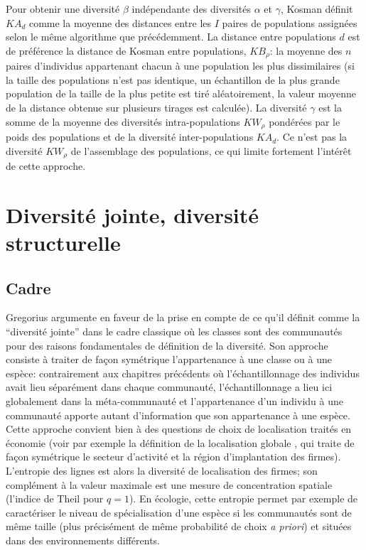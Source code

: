 \documentclass[
  11pt,
  french,
  a4paper,
  extrafontsizes,onecolumn,openright
  ]{memoir}
\begin{document}
Pour obtenir une diversité \(\beta\) indépendante des diversités \(\alpha\) et \(\gamma\), Kosman définit \({KA}_{d}\) comme la moyenne des distances entre les \(I\) paires de populations assignées selon le même algorithme que précédemment.
La distance entre populations \(d\) est de préférence la distance de Kosman entre populations, \({KB}_{\rho}\): la moyenne des \(n\) paires d'individus appartenant chacun à une population les plus dissimilaires (si la taille des populations n'est pas identique, un échantillon de la plus grande population de la taille de la plus petite est tiré aléatoirement, la valeur moyenne de la distance obtenue sur plusieurs tirages est calculée).
La diversité \(\gamma\) est la somme de la moyenne des diversités intra-populations \({KW}_{\rho}\) pondérées par le poids des populations et de la diversité inter-populations \({KA}_{d}\).
Ce n'est pas la diversité \({KW}_{\rho}\) de l'assemblage des populations, ce qui limite fortement l'intérêt de cette approche.

\part{Diversité jointe, diversité structurelle}\label{part-diversituxe9-jointe-diversituxe9-structurelle}

\chapter{Cadre}\label{sec-jointeCadre}

Gregorius \autocite*{Gregorius2010,Gregorius2014} argumente en faveur de la prise en compte de ce qu'il définit comme la ``diversité jointe'' dans le cadre classique où les classes sont des communautés pour des raisons fondamentales de définition de la diversité.
Son approche consiste à traiter de façon symétrique l'appartenance à une classe ou à une espèce: contrairement aux chapitres précédents où l'échantillonnage des individus avait lieu séparément dans chaque communauté, l'échantillonnage a lieu ici globalement dans la méta-communauté et l'appartenance d'un individu à une communauté apporte autant d'information que son appartenance à une espèce.
Cette approche convient bien à des questions de choix de localisation traités en économie (voir par exemple la définition de la localisation globale \autocite{Cutrini2010}, qui traite de façon symétrique le secteur d'activité et la région d'implantation des firmes).
L'entropie des lignes est alors la diversité de localisation des firmes; son complément à la valeur maximale est une mesure de concentration spatiale (l'indice de Theil pour \(q=1\)).
En écologie, cette entropie permet par exemple de caractériser le niveau de spécialisation d'une espèce si les communautés sont de même taille (plus précisément de même probabilité de choix \emph{a priori}) et situées dans des environnements différents.
\end{document}
